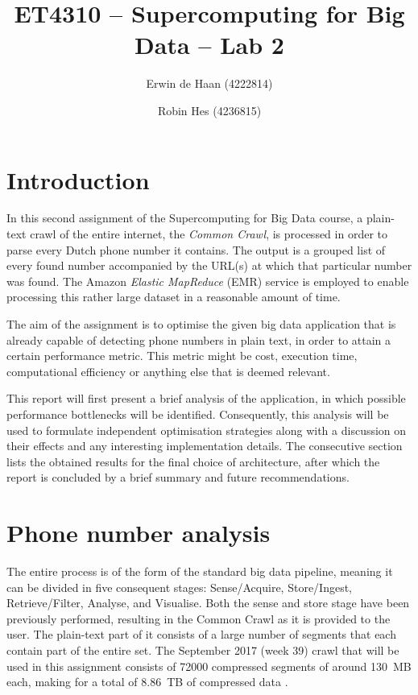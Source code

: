 \documentclass{article}
\title{ET4310 -- Supercomputing for Big Data -- Lab 2}
\author{Erwin de Haan (4222814) \and Robin Hes (4236815)}
\begin{document}
\maketitle
\section{Introduction}
In this second assignment of the Supercomputing for Big Data course, a plain-text crawl of the entire internet, the \emph{Common Crawl}, is processed in order to parse every Dutch phone number it contains.
The output is a grouped list of every found number accompanied by the URL(s) at which that particular number was found.
The Amazon \emph{Elastic MapReduce} (EMR) service is employed to enable processing this rather large dataset in a reasonable amount of time.

The aim of the assignment is to optimise the given big data application that is already capable of detecting phone numbers in plain text, in order to attain a certain performance metric.
This metric might be cost, execution time, computational efficiency or anything else that is deemed relevant.

This report will first present a brief analysis of the application, in which possible performance bottlenecks will be identified.
Consequently, this analysis will be used to formulate independent optimisation strategies along with a discussion on their effects and any interesting implementation details.
The consecutive section lists the obtained results for the final choice of architecture, after which the report is concluded by a brief summary and future recommendations.

\section{Phone number analysis}
The entire process is of the form of the standard big data pipeline, meaning it can be divided in five consequent stages: Sense/Acquire, Store/Ingest, Retrieve/Filter, Analyse, and Visualise.
Both the sense and store stage have been previously performed, resulting in the Common Crawl as it is provided to the user.
The plain-text part of it consists of a large number of segments that each contain part of the entire set.
The September 2017 (week 39) crawl that will be used in this assignment consists of \num{72000} compressed segments of around \SI{130}{MB} each, making for a total of \SI{8.86}{TB} of compressed data \cite{commoncrawl2017september}.
\end{document}
